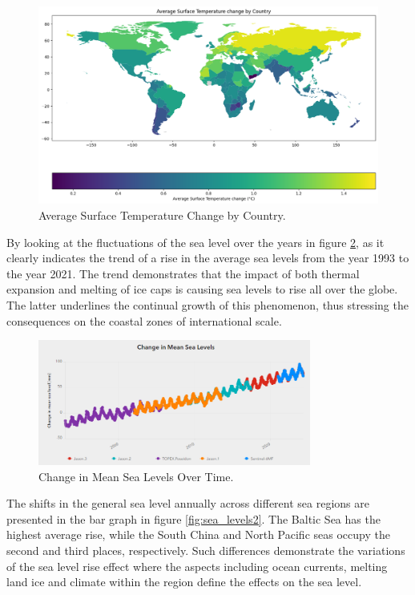 \documentclass[a4paper,11pt]{article}
\begin{document}
\begin{figure}[ht!]
    \centering
    \includegraphics[width=1\textwidth]{pictures/temp_world.png}
    \caption{Average Surface Temperature Change by Country.}
    \label{fig:temp_change}
\end{figure}

By looking at the fluctuations of the sea level over the years in figure \ref{fig:sea_levels}, as it clearly indicates the trend of a rise in the average sea levels from the year 1993 to the year 2021. The trend demonstrates that the impact of both thermal expansion and melting of ice caps is causing sea levels to rise all over the globe. The latter underlines the continual growth of this phenomenon, thus stressing the consequences on the coastal zones of international scale. 

\begin{figure}[h]
    \centering
    \includegraphics[width=0.8\textwidth]{pictures/sea_levels.png}
    \caption{Change in Mean Sea Levels Over Time.}
    \label{fig:sea_levels}
\end{figure}

The shifts in the general sea level annually across different sea regions are presented in the bar graph in figure \ref{fig:sea_levels2}. The Baltic Sea has the highest average rise, while the South China and North Pacific seas occupy the second and third places, respectively. Such differences demonstrate the variations of the sea level rise effect where the aspects including ocean currents, melting land ice and climate within the region define the effects on the sea level. 
\end{document}
